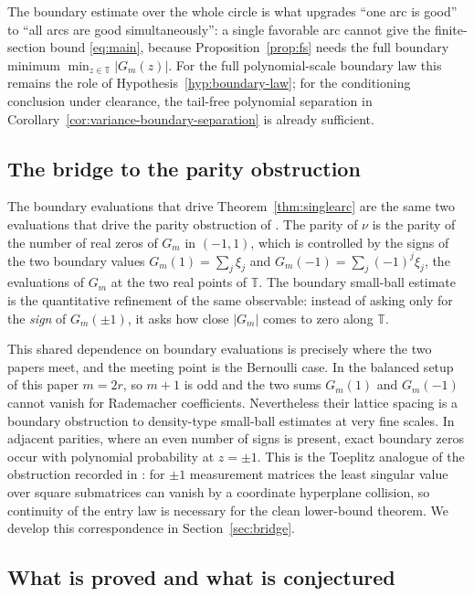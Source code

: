 \documentclass[11pt]{amsart}
\numberwithin{equation}{section}
\theoremstyle{definition}
\theoremstyle{remark}
\newcommand{\T}{\mathbb T}
\newcommand{\abs}[1]{\left\lvert #1\right\rvert}
\begin{document}
The boundary estimate over the whole circle is what upgrades ``one arc is good'' to ``all arcs are good simultaneously'': a single favorable arc cannot give the finite-section bound \eqref{eq:main}, because Proposition~\ref{prop:fs} needs the full boundary minimum $\min_{z\in\T}\abs{G_m(z)}$.  For the full polynomial-scale boundary law this remains the role of Hypothesis~\ref{hyp:boundary-law}; for the conditioning conclusion under clearance, the tail-free polynomial separation in Corollary~\ref{cor:variance-boundary-separation} is already sufficient.

\subsection{The bridge to the parity obstruction}\label{sub:bridge}

The boundary evaluations that drive Theorem~\ref{thm:singlearc} are the same two evaluations that drive the parity obstruction of \cite{Parity}. The parity of $\nu$ is the parity of the number of real zeros of $G_m$ in $(-1,1)$, which is controlled by the signs of the two boundary values $G_m(1)=\sum_j\xi_j$ and $G_m(-1)=\sum_j(-1)^j\xi_j$, the evaluations of $G_m$ at the two real points of $\T$. The boundary small-ball estimate is the quantitative refinement of the same observable: instead of asking only for the \emph{sign} of $G_m(\pm1)$, it asks how close $\abs{G_m}$ comes to zero along $\T$.

This shared dependence on boundary evaluations is precisely where the two papers meet, and the meeting point is the Bernoulli case. In the balanced setup of this paper \(m=2r\), so \(m+1\) is odd and the two sums \(G_m(1)\) and \(G_m(-1)\) cannot vanish for Rademacher coefficients. Nevertheless their lattice spacing is a boundary obstruction to density-type small-ball estimates at very fine scales. In adjacent parities, where an even number of signs is present, exact boundary zeros occur with polynomial probability at \(z=\pm1\). This is the Toeplitz analogue of the obstruction recorded in \cite[Rem.~6.2]{PhaseRetrieval}: for $\pm1$ measurement matrices the least singular value over square submatrices can vanish by a coordinate hyperplane collision, so continuity of the entry law is necessary for the clean lower-bound theorem. We develop this correspondence in Section~\ref{sec:bridge}.

\subsection{What is proved and what is conjectured}\label{sub:honest}
\end{document}
